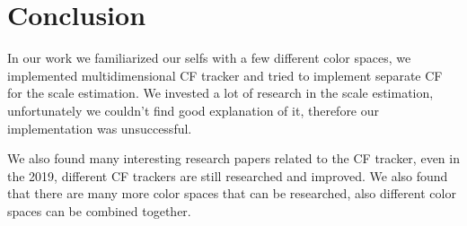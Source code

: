 \documentclass[runningheads]{llncs}
\begin{document}


\newpage
\section{Conclusion}

In our work we familiarized our selfs with a few different color spaces, we implemented multidimensional CF tracker and tried to implement separate CF for the scale estimation. We invested a lot of research in the scale estimation, unfortunately we couldn't find good explanation of it, therefore our implementation was unsuccessful.

We also found many interesting research papers related to the CF tracker, even in the 2019, different CF trackers are still researched and improved. We also found that there are many more color spaces that can be researched, also different color spaces can be combined together.



\end{document}
